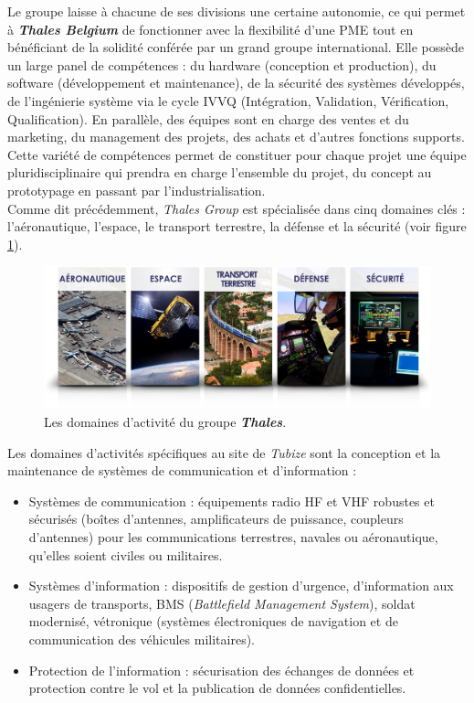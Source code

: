 \documentclass[10pt, oneside, a4paper]{article}
\begin{document}
\hspace{-0.5 cm}Le groupe laisse à chacune de ses divisions une certaine autonomie, ce qui permet à \textbf{\textit{Thales Belgium}} de fonctionner avec la flexibilité d’une PME tout en bénéficiant de la solidité conférée par un grand groupe international. Elle possède un large panel de compétences : du hardware (conception et production), du software (développement et maintenance), de la sécurité des systèmes développés, de l’ingénierie système via le cycle IVVQ (Intégration, Validation, Vérification, Qualification). En parallèle, des équipes sont en charge des ventes et du marketing, du management des projets, des achats et d’autres fonctions supports. Cette variété de compétences permet de constituer pour chaque projet une équipe pluridisciplinaire qui prendra en charge l’ensemble du projet, du concept au prototypage en passant par l’industrialisation. \\

Comme dit précédemment, \textit{Thales Group} est spécialisée dans cinq domaines clés : l'aéronautique, l'espace, le transport terrestre, la défense et la sécurité (voir figure \ref{fig:thales}). 
\begin{figure}[htbp]
    \centering
    \includegraphics[scale=0.56]{image/thales}
    \caption{Les domaines d'activité du groupe \textbf{\textit{Thales}}.}
    \label{fig:thales}
\end{figure}

\vspace{-0.4 cm}\hspace{-0.5 cm}Les domaines d’activités spécifiques au site de \textit{Tubize} sont la conception et la maintenance de systèmes de communication et d’information :
\begin{itemize}
\item Systèmes de communication : équipements radio HF et VHF robustes et sécurisés (boîtes d’antennes, amplificateurs de puissance, coupleurs d’antennes) pour les communications terrestres, navales ou aéronautique, qu’elles soient civiles ou militaires.
\item Systèmes d’information : dispositifs de gestion d’urgence, d’information aux usagers de transports, BMS (\textit{Battlefield Management System}), soldat modernisé, vétronique (systèmes électroniques de navigation et de communication des véhicules militaires).
\item Protection de l’information : sécurisation des échanges de données et protection contre le vol et la publication de données confidentielles. \\
\end{itemize}
\end{document}
